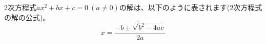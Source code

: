 \documentclass{ltjsarticle}
\begin{document}
2次方程式$ax^2 + bx + c = 0\ (a \neq 0)$の解は、以下のように表されます(2次方程式の解の公式)。
\[ x = \frac{-b \pm \sqrt{b^2 - 4ac}}{2a} \]
\end{document}
